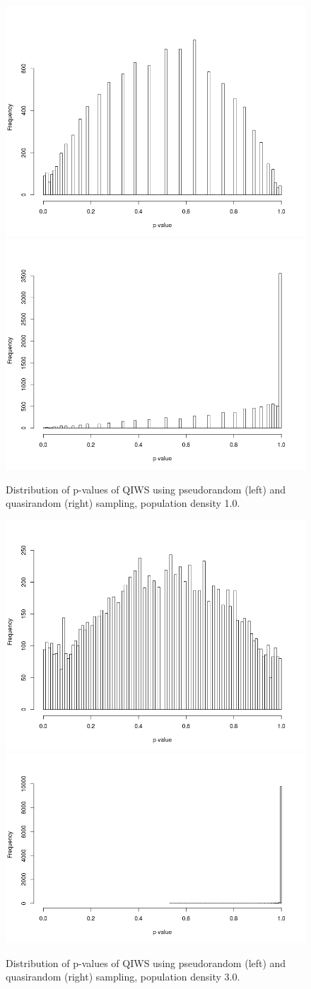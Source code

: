 \documentclass{JASSS}
\begin{document}
\begin{figure}[!t]
\centering
\includegraphics[width=0.498\linewidth]{figures/hist_pseudo_1} 
\includegraphics[width=0.498\linewidth]{figures/hist_quasi_1} 
\caption{Distribution of p-values of QIWS using pseudorandom (left) and quasirandom (right) sampling, population density 1.0.}
\label{fig:hist_sampling1}
\end{figure}

\begin{figure}[!t]
\centering
\includegraphics[width=0.498\linewidth]{figures/hist_pseudo_3} 
\includegraphics[width=0.498\linewidth]{figures/hist_quasi_3} 
\caption{Distribution of p-values of QIWS using pseudorandom (left) and quasirandom (right) sampling, population density 3.0.}
\label{fig:hist_sampling3}
\end{figure}
\end{document}
